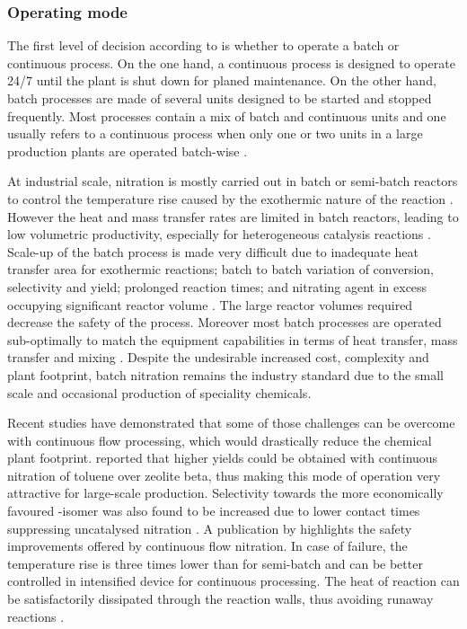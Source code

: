 \subsubsection{Operating mode} %
\label{sec:continuous}
The first level of decision according to \textcite{douglas_conceptual_1988} is whether to operate a batch or continuous process. On the one hand, a continuous process is designed to operate 24/7 until the plant is shut down for planed maintenance. On the other hand, batch processes are made of several units designed to be started and stopped frequently. Most processes contain a mix of batch and continuous units and one usually refers to a continuous process when only one or two units in a large production plants are operated batch-wise \cite{douglas_conceptual_1988}. 

At industrial scale, nitration is mostly carried out in batch or semi-batch reactors to control the temperature rise caused by the exothermic nature of the reaction \cite{booth_nitro_2000,dugal_nitrobenzene_2005}. However the heat and mass transfer rates are limited in batch reactors, leading to low volumetric productivity, especially for heterogeneous catalysis reactions \cite{randall_process_2020}. Scale-up of the batch process is made very difficult due to inadequate heat transfer area for exothermic reactions; batch to batch variation of conversion, selectivity and yield; prolonged reaction times; and nitrating agent in excess occupying significant reactor volume \cite{kulkarni_continuous_2014}. The large reactor volumes required decrease the safety of the process. Moreover most batch processes are operated sub-optimally to match the equipment capabilities in terms of heat transfer, mass transfer and mixing \cite{randall_process_2020}. Despite the undesirable increased cost, complexity and plant footprint, batch nitration remains the industry standard due to the small scale and occasional production of speciality chemicals. 

Recent studies have demonstrated that some of those challenges can be overcome with continuous flow processing, which would drastically reduce the chemical plant footprint. \textcite{kuba_batch_2007} reported that higher yields could be obtained with continuous nitration of toluene over zeolite beta, thus making this mode of operation very attractive for large-scale production. Selectivity towards the more economically favoured \para-isomer was also found to be increased due to lower contact times suppressing uncatalysed nitration \cite{kuba_batch_2007}. A publication by \textcite{di_miceli_raimondi_safety_2015} highlights the safety improvements offered by continuous flow nitration. In case of failure, the temperature rise is three times lower than for semi-batch and can be better controlled in intensified device for continuous processing. The heat of reaction can be satisfactorily dissipated through the reaction walls, thus avoiding runaway reactions \cite{di_miceli_raimondi_safety_2015}. 

